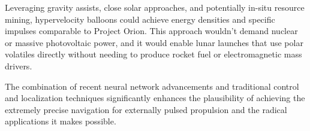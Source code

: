 \documentclass{article}
\begin{document}
Leveraging gravity assists, close solar approaches, and potentially in-situ resource mining, hypervelocity balloons could achieve energy densities and specific impulses comparable to Project Orion. This approach wouldn't demand nuclear or massive photovoltaic power, and it would enable lunar launches that use polar volatiles directly without needing to produce rocket fuel or electromagnetic mass drivers.     

The combination of recent neural network advancements and traditional control and localization techniques significantly enhances the plausibility of achieving the extremely precise navigation for externally pulsed propulsion and the radical applications it makes possible.



  
  
\end{document}
